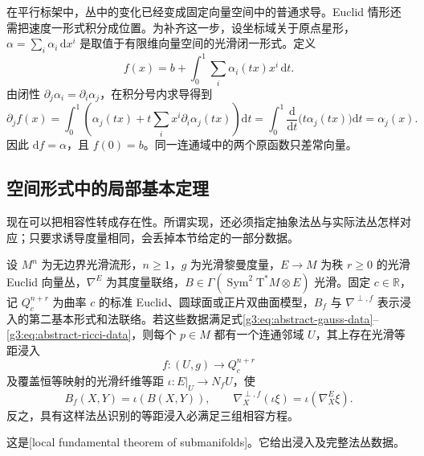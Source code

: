在平行标架中，丛中的变化已经变成固定向量空间中的普通求导。Euclid 情形还需把速度一形式积分成位置。为补齐这一步，设坐标域关于原点星形，\(\alpha=\sum_i\alpha_i\,\mathrm dx^i\) 是取值于有限维向量空间的光滑闭一形式。定义
\begin{equation}\label{g3:eq:star-shaped-one-form-primitive}
	f(x)=b+\int_0^1\sum_i\alpha_i(tx)x^i\,\mathrm dt.
\end{equation}
由闭性 \(\partial_j\alpha_i=\partial_i\alpha_j\)，在积分号内求导得到
\[
	\partial_jf(x)=\int_0^1\left(\alpha_j(tx)
	+t\sum_i x^i\partial_i\alpha_j(tx)\right)\mathrm dt
	=\int_0^1\frac{\mathrm d}{\mathrm dt}\bigl(t\alpha_j(tx)\bigr)\mathrm dt
	=\alpha_j(x).
\]
因此 \(\mathrm df=\alpha\)，且 \(f(0)=b\)。同一连通域中的两个原函数只差常向量。

\subsection{空间形式中的局部基本定理}
\label{g3:subsec:0403:03}

现在可以把相容性转成存在性。所谓实现，还必须指定抽象法丛与实际法丛怎样对应；只要求诱导度量相同，会丢掉本节给定的一部分数据。

\begin{theorem}[子流形的局部基本定理]\label{g3:thm:submanifold-fundamental-local}
	设 \(M^n\) 为无边界光滑流形，\(n\geq1\)，\(g\) 为光滑黎曼度量，\(E\to M\) 为秩 \(r\geq0\) 的光滑 Euclid 向量丛，\(\nabla^E\) 为其度量联络，\(B\in\Gamma(\operatorname{Sym}^2\mathrm T^*M\otimes E)\) 光滑。固定 \(c\in\mathbb R\)，记 \(Q_c^{n+r}\) 为曲率 \(c\) 的标准 Euclid、圆球面或正片双曲面模型，\(B_f\) 与 \(\nabla^{\perp,f}\) 表示浸入的第二基本形式和法联络。若这些数据满足式\eqref{g3:eq:abstract-gauss-data}--\eqref{g3:eq:abstract-ricci-data}，则每个 \(p\in M\) 都有一个连通邻域 \(U\)，其上存在光滑等距浸入
	\[
		f:(U,g)\longrightarrow Q_c^{n+r}
	\]
	及覆盖恒等映射的光滑纤维等距 \(\iota:E|_U\to N_fU\)，使
	\[
		B_f(X,Y)=\iota(B(X,Y)),\qquad
		\nabla^{\perp,f}_X(\iota\xi)=\iota(\nabla^E_X\xi).
	\]
	反之，具有这样法丛识别的等距浸入必满足三组相容方程。
\end{theorem}

这是[local fundamental theorem of submanifolds]。它给出浸入及完整法丛数据。

